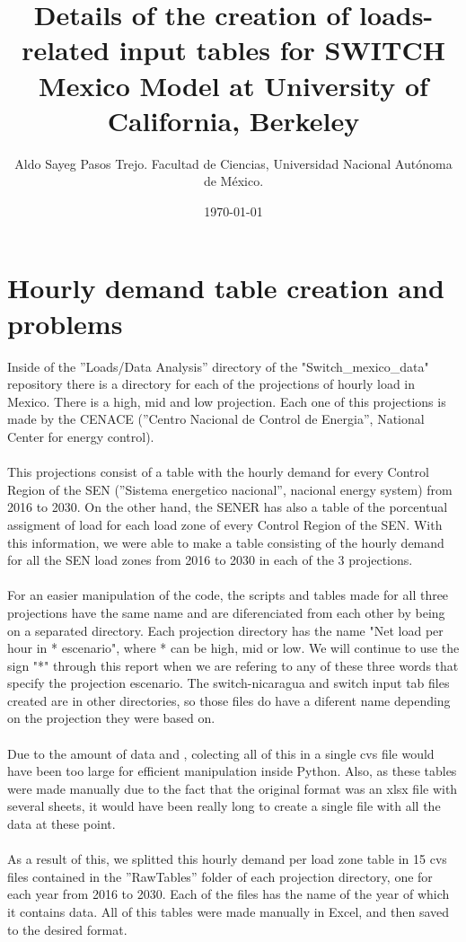 \documentclass{article}
\author{Aldo Sayeg Pasos Trejo. Facultad de Ciencias, Universidad Nacional Autónoma de México.}
\date{\today}
\title{Details of the creation of loads-related input tables for SWITCH Mexico Model at University of California, Berkeley}
\begin{document}
\maketitle
\section{Hourly demand table creation and problems}
Inside of the ''Loads/Data Analysis'' directory of the "Switch\_mexico\_data" repository there is a directory for each of the projections of hourly load in Mexico. There is a high, mid and low projection. Each one of this projections is made by the CENACE (''Centro Nacional de Control de Energia'', National Center for energy control). 
\\
\\This projections consist of a table with the hourly demand for every Control Region of the SEN (''Sistema energetico nacional'', nacional energy system) from 2016 to 2030. On the other hand, the SENER has also a table of the porcentual assigment of load for each load zone of every Control Region of the SEN. With this information, we were able to make a table consisting of the hourly demand for all the SEN load zones from 2016 to 2030 in each of the 3 projections. 
\\
\\For an easier manipulation of the code, the scripts and tables made for all three projections have the same name and are diferenciated from each other by being on a separated directory. Each projection directory has the name "Net load per hour in * escenario", where * can be high, mid or low. We will continue to use the sign "*" through this report when we are refering to any of these three words that specify the projection escenario. The switch-nicaragua and switch input tab files created are in other directories, so those files do have a diferent name depending on the projection they were based on.
\\
\\Due to the amount of data and , colecting all of this in a single cvs file would have been too large for efficient manipulation inside Python. Also, as these tables were made manually due to the fact that the original format was an xlsx file with several sheets, it would have been really long to create a single file with all the data at these point. 
\\
\\As a result of this, we splitted this hourly demand per load zone table in 15 cvs files contained in the ''RawTables'' folder of each projection directory, one for each year from 2016 to 2030. Each of the files has the name of the year of which it contains data. All of this tables were made manually in Excel, and then saved to the desired format.
\end{document}
